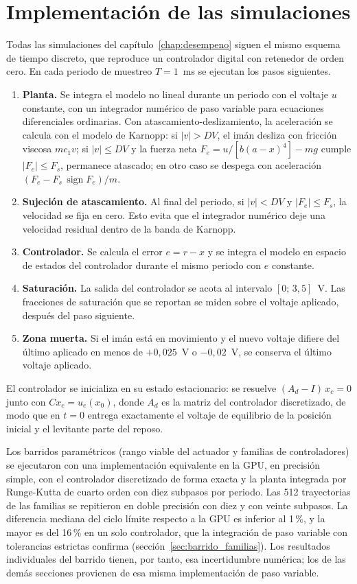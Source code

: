 \chapter{Implementación de las simulaciones}\label{ap:simulacion}

Todas las simulaciones del capítulo~\ref{chap:desempeno} siguen el mismo esquema de tiempo discreto, que reproduce un controlador digital con retenedor de orden cero. En cada periodo de muestreo $T=1$~ms se ejecutan los pasos siguientes.

\begin{enumerate}
  \item \textbf{Planta.} Se integra el modelo no lineal durante un periodo con el voltaje $u$ constante, con un integrador numérico de paso variable para ecuaciones diferenciales ordinarias. Con atascamiento-deslizamiento, la aceleración se calcula con el modelo de Karnopp: si $|v|>DV$, el imán desliza con fricción viscosa $m c_1 v$; si $|v|\le DV$ y la fuerza neta $F_e=u/[b(a-x)^4]-mg$ cumple $|F_e|\le F_s$, permanece atascado; en otro caso se despega con aceleración $(F_e - F_s\,\operatorname{sign}F_e)/m$.
  \item \textbf{Sujeción de atascamiento.} Al final del periodo, si $|v|<DV$ y $|F_e|\le F_s$, la velocidad se fija en cero. Esto evita que el integrador numérico deje una velocidad residual dentro de la banda de Karnopp.
  \item \textbf{Controlador.} Se calcula el error $e=r-x$ y se integra el modelo en espacio de estados del controlador durante el mismo periodo con $e$ constante.
  \item \textbf{Saturación.} La salida del controlador se acota al intervalo $[0;\,3{,}5]$~V. Las fracciones de saturación que se reportan se miden sobre el voltaje aplicado, después del paso siguiente.
  \item \textbf{Zona muerta.} Si el imán está en movimiento y el nuevo voltaje difiere del último aplicado en menos de $+0{,}025$~V o $-0{,}02$~V, se conserva el último voltaje aplicado.
\end{enumerate}

El controlador se inicializa en su estado estacionario: se resuelve $(A_d - I)\,x_c = 0$ junto con $C x_c = u_e(x_0)$, donde $A_d$ es la matriz del controlador discretizado, de modo que en $t=0$ entrega exactamente el voltaje de equilibrio de la posición inicial y el levitante parte del reposo.

Los barridos paramétricos (rango viable del actuador y familias de controladores) se ejecutaron con una implementación equivalente en la GPU, en precisión simple, con el controlador discretizado de forma exacta y la planta integrada por Runge-Kutta de cuarto orden con diez subpasos por periodo. Las 512 trayectorias de las familias se repitieron en doble precisión con diez y con veinte subpasos. La diferencia mediana del ciclo límite respecto a la GPU es inferior al 1\,\%, y la mayor es del 16\,\% en un solo controlador, que la integración de paso variable con tolerancias estrictas confirma (sección~\ref{sec:barrido_familias}). Los resultados individuales del barrido tienen, por tanto, esa incertidumbre numérica; los de las demás secciones provienen de esa misma implementación de paso variable.

